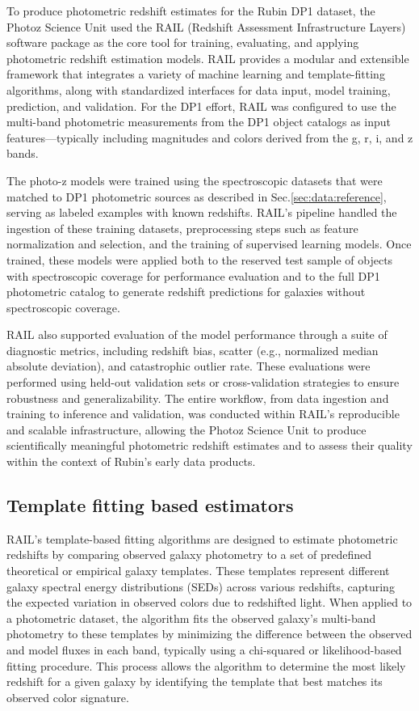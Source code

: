 To produce photometric redshift estimates for the Rubin DP1 dataset, the Photoz Science Unit used the RAIL (Redshift Assessment Infrastructure Layers) software package as the core tool for training, evaluating, and applying photometric redshift estimation models. RAIL provides a modular and extensible framework that integrates a variety of machine learning and template-fitting algorithms, along with standardized interfaces for data input, model training, prediction, and validation. For the DP1 effort, RAIL was configured to use the multi-band photometric measurements from the DP1 object catalogs as input features—typically including magnitudes and colors derived from the g, r, i, and z bands.

The photo-z models were trained using the spectroscopic datasets that were matched to DP1 photometric sources as described in Sec.\ref{sec:data:reference}, serving as labeled examples with known redshifts. RAIL's pipeline handled the ingestion of these training datasets, preprocessing steps such as feature normalization and selection, and the training of supervised learning models.  Once trained, these models were applied both to the reserved test sample of objects with spectroscopic coverage for performance evaluation and to 
 the full DP1 photometric catalog to generate redshift predictions for galaxies without spectroscopic coverage.

RAIL also supported evaluation of the model performance through a suite of diagnostic metrics, including redshift bias, scatter (e.g., normalized median absolute deviation), and catastrophic outlier rate. These evaluations were performed using held-out validation sets or cross-validation strategies to ensure robustness and generalizability. The entire workflow, from data ingestion and training to inference and validation, was conducted within RAIL’s reproducible and scalable infrastructure, allowing the Photoz Science Unit to produce scientifically meaningful photometric redshift estimates and to assess their quality within the context of Rubin’s early data products.


\subsection{Template fitting based estimators}
\label{sec:method:template}

RAIL’s template-based fitting algorithms are designed to estimate photometric redshifts by comparing observed galaxy photometry to a set of predefined theoretical or empirical galaxy templates. These templates represent different galaxy spectral energy distributions (SEDs) across various redshifts, capturing the expected variation in observed colors due to redshifted light. When applied to a photometric dataset, the algorithm fits the observed galaxy’s multi-band photometry to these templates by minimizing the difference between the observed and model fluxes in each band, typically using a chi-squared or likelihood-based fitting procedure. This process allows the algorithm to determine the most likely redshift for a given galaxy by identifying the template that best matches its observed color signature.


